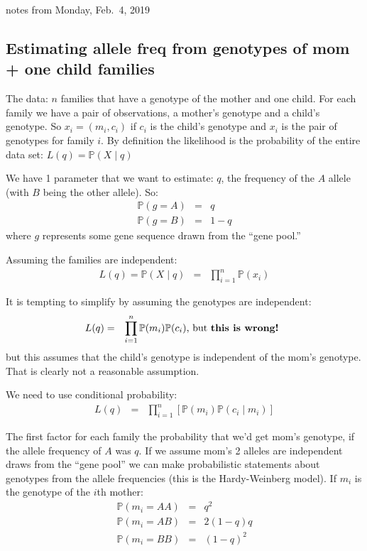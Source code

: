 \documentclass[11pt]{article}
\renewcommand{\Pr}{\mathbb{P}}
\begin{document}
notes from Monday, Feb.~4, 2019 \\
\subsection*{Estimating allele freq from genotypes of mom + one child families}
The data: $n$ families that have a genotype of the mother and one child.
For each family we have a pair of observations, a mother's genotype and a child's genotype.
So $x_i = (m_i, c_i)$ if $c_i$ is the child's genotype and $x_i$ is the pair of genotypes
for family $i$.
By definition the likelihood is the probability of the entire data set: $L(q) = \Pr(X\mid q)$

We have 1 parameter that we want to estimate: $q$, the frequency of the $A$ allele (with $B$ being the other allele). So:
\begin{eqnarray}
  \Pr(g = A) & = & q \\
  \Pr(g = B) & = & 1- q
\end{eqnarray}
where $g$ represents some gene sequence drawn from the ``gene pool.''

Assuming the families are independent:
\begin{eqnarray}
  L(q) = \Pr(X\mid q) & = & \prod_{i=1}^{n}\Pr(x_i) 
\end{eqnarray}

It is tempting to simplify by assuming the genotypes are independent:
\begin{eqnarray}\nonumber
  L(q) & = & \prod_{i=1}^{n}\Pr(m_i)\Pr(c_i) \mbox{, but \bf{this is wrong!} } 
\end{eqnarray}
but this assumes that the child's genotype is independent of the mom's genotype. 
That is clearly not a reasonable assumption.

We need to use conditional probability:
\begin{eqnarray}\nonumber
  L(q) & = & \prod_{i=1}^{n}\left[\Pr\left(m_i\right)\Pr\left(c_i\mid m_i\right)\right]
\end{eqnarray}

The first factor for each family the probability that we'd get mom's genotype, if
the allele frequency of $A$ was $q$.
If we assume mom's 2 alleles are independent draws from the ``gene pool'' we can 
make probabilistic statements about genotypes from the allele frequencies (this 
is the Hardy-Weinberg model).
If $m_i$ is the genotype of the $i$th mother:
\begin{eqnarray}
  \Pr(m_i = AA) & = & q^2 \\
  \Pr(m_i = AB) & = & 2(1-q) q \\
  \Pr(m_i = BB) & = & \left(1 - q\right)^2
\end{eqnarray}
\end{document}

